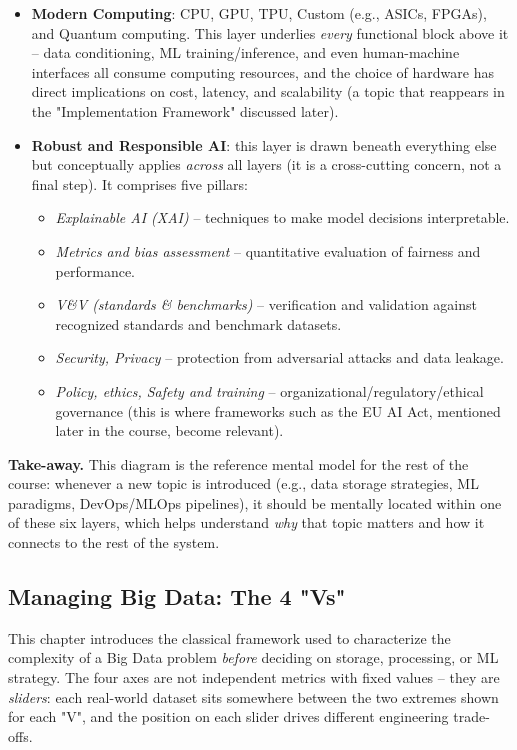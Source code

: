 \begin{itemize}
    \item \textbf{Modern Computing}: CPU, GPU, TPU, Custom (e.g., ASICs, FPGAs), and Quantum computing. This layer underlies \emph{every} functional block above it -- data conditioning, ML training/inference, and even human-machine interfaces all consume computing resources, and the choice of hardware has direct implications on cost, latency, and scalability (a topic that reappears in the "Implementation Framework" discussed later).
    \vspace{0.2cm}
    \item \textbf{Robust and Responsible AI}: this layer is drawn beneath everything else but conceptually applies \emph{across} all layers (it is a cross-cutting concern, not a final step). It comprises five pillars:
    \begin{itemize}
        \item \emph{Explainable AI (XAI)} -- techniques to make model decisions interpretable.
        \item \emph{Metrics and bias assessment} -- quantitative evaluation of fairness and performance.
        \item \emph{V\&V (standards \& benchmarks)} -- verification and validation against recognized standards and benchmark datasets.
        \item \emph{Security, Privacy} -- protection from adversarial attacks and data leakage.
        \item \emph{Policy, ethics, Safety and training} -- organizational/regulatory/ethical governance (this is where frameworks such as the EU AI Act, mentioned later in the course, become relevant).
    \end{itemize}
\end{itemize}



\textbf{Take-away.} This diagram is the reference mental model for the rest of the course: whenever a new topic is introduced (e.g., data storage strategies, ML paradigms, DevOps/MLOps pipelines), it should be mentally located within one of these six layers, which helps understand \emph{why} that topic matters and how it connects to the rest of the system.

\subsection{ Managing Big Data: The 4 "Vs"}

This chapter introduces the classical framework used to characterize the complexity of a Big Data problem \emph{before} deciding on storage, processing, or ML strategy. The four axes are not independent metrics with fixed values -- they are \emph{sliders}: each real-world dataset sits somewhere between the two extremes shown for each "V", and the position on each slider drives different engineering trade-offs.

